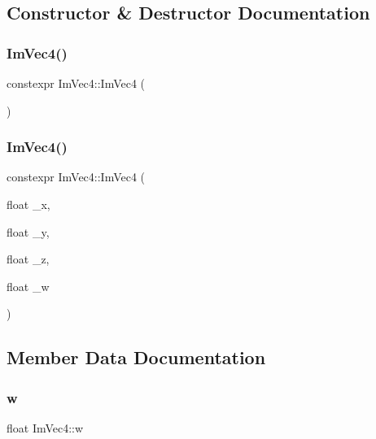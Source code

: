 \subsection{Constructor \& Destructor Documentation}
\mbox{\label{structImVec4_a3844a618a19bddbe806b8ce0775bfb0e}} 
\subsubsection{\texorpdfstring{Im\+Vec4()}{ImVec4()}\hspace{0.1cm}{\footnotesize\ttfamily [1/2]}}
{\footnotesize\ttfamily constexpr Im\+Vec4\+::\+Im\+Vec4 (\begin{DoxyParamCaption}{ }\end{DoxyParamCaption})\hspace{0.3cm}{\ttfamily [inline]}}

\mbox{\label{structImVec4_ac05b0806cef1a557f8c386b1b4af6703}} 
\subsubsection{\texorpdfstring{Im\+Vec4()}{ImVec4()}\hspace{0.1cm}{\footnotesize\ttfamily [2/2]}}
{\footnotesize\ttfamily constexpr Im\+Vec4\+::\+Im\+Vec4 (\begin{DoxyParamCaption}\item[{float}]{\+\_\+x,  }\item[{float}]{\+\_\+y,  }\item[{float}]{\+\_\+z,  }\item[{float}]{\+\_\+w }\end{DoxyParamCaption})\hspace{0.3cm}{\ttfamily [inline]}}



\subsection{Member Data Documentation}
\mbox{\label{structImVec4_afeed5acd9f0d2043175f4da229d12a38}} 
\subsubsection{\texorpdfstring{w}{w}}
{\footnotesize\ttfamily float Im\+Vec4\+::w}

